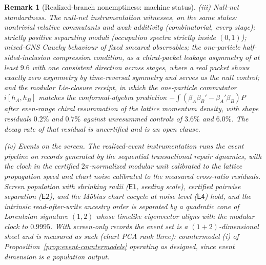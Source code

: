 \documentclass[11pt]{article}
\newtheorem{remark}[theorem]{Remark}
\begin{document}
\begin{remark}[Realized-branch nonemptiness: machine status]
(iii) \emph{Null-net standardness.} The null-net instrumentation
witnesses, on the same
states: nontrivial relative commutants and weak additivity (combinatorial,
every stage); strictly positive separating moduli (occupation spectra
strictly inside \((0,1)\)); mixed-GNS Cauchy behaviour of fixed smeared
observables; the one-particle half-sided-inclusion compression condition,
as a chiral-packet leakage asymmetry of at least \(9.6\) with one
consistent direction across stages, where a real packet shows exactly zero
asymmetry by time-reversal symmetry and serves as the null control; and
the modular Lie-closure receipt, in which the one-particle commutator
\(i[h_A,h_B]\) matches the conformal-algebra prediction
\(-\!\int(\beta_A\beta_B'-\beta_A'\beta_B)P\) after even-range chiral
resummation of the lattice momentum density, with shape residuals
\(0.2\%\) and \(0.7\%\) against unresummed controls of \(3.6\%\) and
\(6.0\%\). The decay rate of that residual is uncertified and is an open
clause.

(iv) \emph{Events on the screen.} The realized-event instrumentation
runs the event
pipeline on records generated by the sequential transactional repair
dynamics, with the clock in the certified \(2\pi\)-normalized modular unit
calibrated to the lattice propagation speed and chart noise calibrated to
the measured cross-ratio residuals. Screen population with shrinking radii
(\(\mathsf{E1}\), seeding scale), certified pairwise separation
(\(\mathsf{E2}\)), and the M\"obius chart cocycle at noise level
(\(\mathsf{E4}\)) hold, and the intrinsic read-after-write ancestry order
is separated by a quadratic cone of Lorentzian signature \((1,2)\) whose
timelike eigenvector aligns with the modular clock to \(0.9995\). With
screen-only records the event set is a \((1{+}2)\)-dimensional sheet and
is measured as such (chart PCA rank three): countermodel (i) of
Proposition~\ref{prop:event-countermodels} operating as designed, since
event dimension is a population output.


\end{remark}
\end{document}
